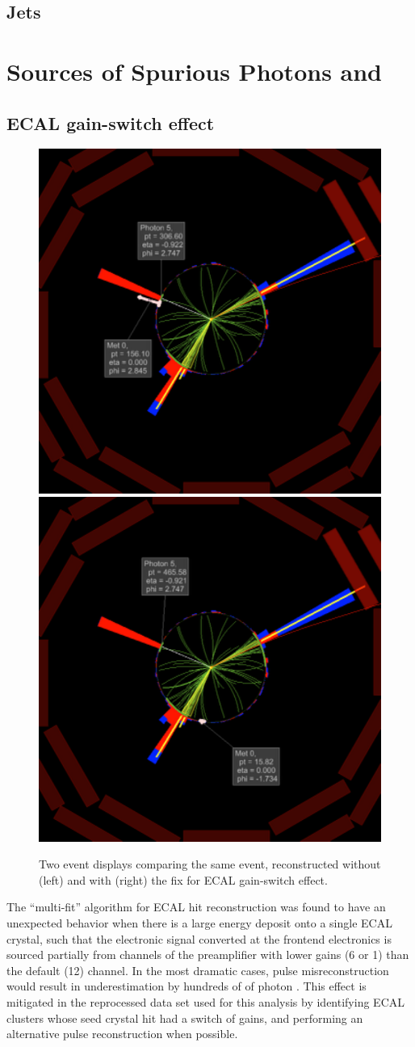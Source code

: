\subsection{Jets}
\label{sec:ana_jets}

\section{Sources of Spurious Photons and \met}
\label{sec:issues}

\subsection{ECAL gain-switch effect}
\label{sec:gainswitch}

\begin{figure}[htbp]
  \centering
  \includegraphics[width=0.48\linewidth]{Reconstruction/Figures/gsfix/evdisp_before.pdf}
  \includegraphics[width=0.48\linewidth]{Reconstruction/Figures/gsfix/evdisp_after.pdf}
  \caption{
    Two event displays comparing the same event, reconstructed without (left) and with (right) the fix for ECAL gain-switch effect.
  }
  \label{fig:eventdisplay_gsfix}
\end{figure}

The ``multi-fit'' algorithm for ECAL hit reconstruction was found to have an unexpected behavior when there is a large energy deposit onto a single ECAL crystal, such that the electronic signal converted at the frontend electronics is sourced partially from channels of the preamplifier with lower gains (6 or 1) than the default (12) channel. 
In the most dramatic cases, pulse misreconstruction would result in underestimation by hundreds of \GeV of photon \pt. 
This effect is mitigated in the reprocessed data set used for this analysis by identifying ECAL clusters whose seed crystal hit had a switch of gains, and performing an alternative pulse reconstruction when possible.

